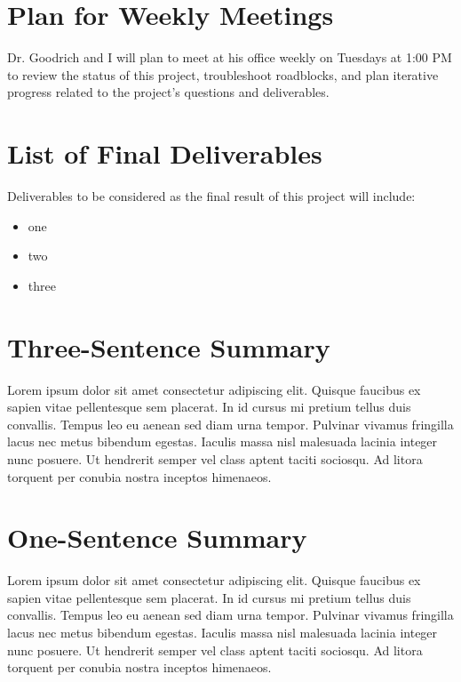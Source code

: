 \documentclass[12pt]{article}
\newcommand{\sectionwithindent}[1]{%
    \section*{#1}%
    \hspace{\parindent} %
}
\begin{document}
\newpage
\printbibliography

\newpage
\sectionwithindent{Plan for Weekly Meetings}
Dr. Goodrich and I will plan to meet at his office weekly on Tuesdays at 1:00 PM to review the status of this project, troubleshoot roadblocks, and plan iterative progress related to the project's questions and deliverables.

\sectionwithindent{List of Final Deliverables}
Deliverables to be considered as the final result of this project will include:
\begin{itemize}
    \item one
    \item two
    \item three
\end{itemize}

\sectionwithindent{Three-Sentence Summary}
Lorem ipsum dolor sit amet consectetur adipiscing elit. Quisque faucibus ex sapien vitae pellentesque sem placerat. In id cursus mi pretium tellus duis convallis. Tempus leo eu aenean sed diam urna tempor. Pulvinar vivamus fringilla lacus nec metus bibendum egestas. Iaculis massa nisl malesuada lacinia integer nunc posuere. Ut hendrerit semper vel class aptent taciti sociosqu. Ad litora torquent per conubia nostra inceptos himenaeos.

\sectionwithindent{One-Sentence Summary}
Lorem ipsum dolor sit amet consectetur adipiscing elit. Quisque faucibus ex sapien vitae pellentesque sem placerat. In id cursus mi pretium tellus duis convallis. Tempus leo eu aenean sed diam urna tempor. Pulvinar vivamus fringilla lacus nec metus bibendum egestas. Iaculis massa nisl malesuada lacinia integer nunc posuere. Ut hendrerit semper vel class aptent taciti sociosqu. Ad litora torquent per conubia nostra inceptos himenaeos.
\end{document}
